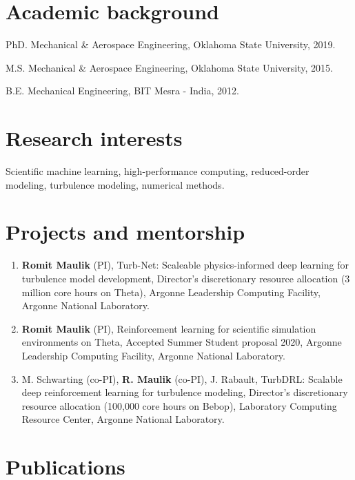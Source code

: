\documentclass[letterpaper]{article}
\renewenvironment{itemize}{
  \begin{list}{}{
    \setlength{\leftmargin}{1.5em}
  }
}{
  \end{list}
}
\begin{document}
\section*{Academic background}

\begin{itemize}
  \item PhD. Mechanical \& Aerospace Engineering, Oklahoma State University, 2019.
  \item M.S. Mechanical \& Aerospace Engineering, Oklahoma State University, 2015.
  \item B.E. Mechanical Engineering, BIT Mesra - India, 2012. 
\end{itemize}

\section*{Research interests}

Scientific machine learning, high-performance computing, reduced-order modeling, turbulence modeling, numerical methods. 

\section*{Projects and mentorship}

\begin{enumerate}
    \item \textbf{Romit Maulik} (PI), Turb-Net: Scaleable physics-informed deep learning for turbulence model development, Director's discretionary resource allocation (3 million core hours on Theta), Argonne Leadership Computing Facility, Argonne National Laboratory.

    \item \textbf{Romit Maulik} (PI), Reinforcement learning for scientific simulation environments on Theta, Accepted Summer Student proposal 2020, Argonne Leadership Computing Facility, Argonne National Laboratory.

    \item M. Schwarting (co-PI), \textbf{R. Maulik} (co-PI), J. Rabault, TurbDRL: Scalable deep reinforcement learning for turbulence modeling, Director's discretionary resource allocation (100,000 core hours on Bebop), Laboratory Computing Resource Center, Argonne National Laboratory.
\end{enumerate}

\section*{Publications}
\end{document}
